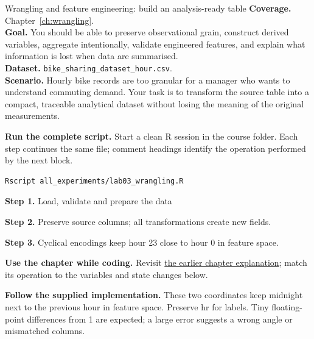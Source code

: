 
\begin{labproject}{Wrangling and feature engineering: build an analysis-ready table}
\textbf{Coverage.} Chapter~\ref{ch:wrangling}.\\
\textbf{Goal.} You should be able to preserve observational grain, construct derived variables, aggregate intentionally, validate engineered features, and explain what information is lost when data are summarised.\\
\textbf{Dataset.} \texttt{bike\_sharing\_dataset\_hour.csv}.\\
\textbf{Scenario.} Hourly bike records are too granular for a manager who wants to understand commuting demand. Your task is to transform the source table into a compact, traceable analytical dataset without losing the meaning of the original measurements.



\textbf{Run the complete script.} Start a clean R session in the course folder. Each step continues the same file; comment headings identify the operation performed by the next block.
\begin{lstlisting}[style=utpterminal]
Rscript all_experiments/lab03_wrangling.R
\end{lstlisting}

\noindent\textbf{Step 1.} Load, validate and prepare the data


\noindent\textbf{Step 2.} Preserve source columns; all transformations create new fields.



\noindent\textbf{Step 3.} Cyclical encodings keep hour 23 close to hour 0 in feature space.


\textbf{Use the chapter while coding.} Revisit \hyperref[ch:wrangling]{the earlier chapter explanation}; match its operation to the variables and state changes below.

\textbf{Follow the supplied implementation.} These two coordinates keep midnight next to the previous hour in feature space. Preserve hr for labels. Tiny floating-point differences from 1 are expected; a large error suggests a wrong angle or mismatched columns.





\end{labproject}
